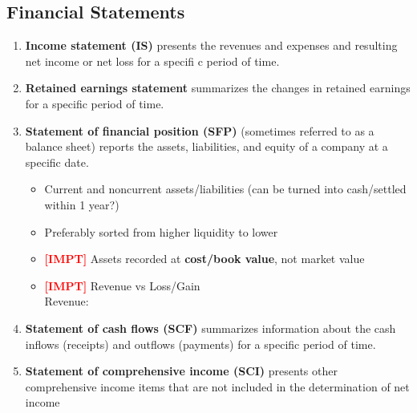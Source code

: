 \documentclass{article}
\newcommand{\impt}[0]{\textcolor{red}{\textbf{[IMPT] }}}
\begin{document}
\begin{multicols}{2}
\subsection{Financial Statements}
\begin{enumerate}
	\item \textbf{Income statement (IS)} presents the revenues and expenses and resulting net  income or net loss for a specifi c period of time.
	\item \textbf{Retained earnings statement} summarizes the changes in retained earnings for a specific period of time.
	\item \textbf{Statement of financial position (SFP)} (sometimes referred to as a balance sheet) reports the assets, liabilities, and equity of a company at a specific date.
	\begin{itemize}
		\item Current and noncurrent assets/liabilities (can be turned into cash/settled within 1 year?)
		\item Preferably sorted from higher liquidity to lower 
		\item \impt Assets recorded at \textbf{cost/book value}, not market value
		\item \impt Revenue vs Loss/Gain\\
		Revenue: 
	\end{itemize}
	\item \textbf{Statement of cash flows (SCF)} summarizes information about the cash inflows (receipts) and outflows (payments) for a specific period of time.
	\item \textbf{Statement of comprehensive income (SCI)} presents other comprehensive income items that are not included in the determination of net income
\end{enumerate}
\end{multicols}
\end{document}
